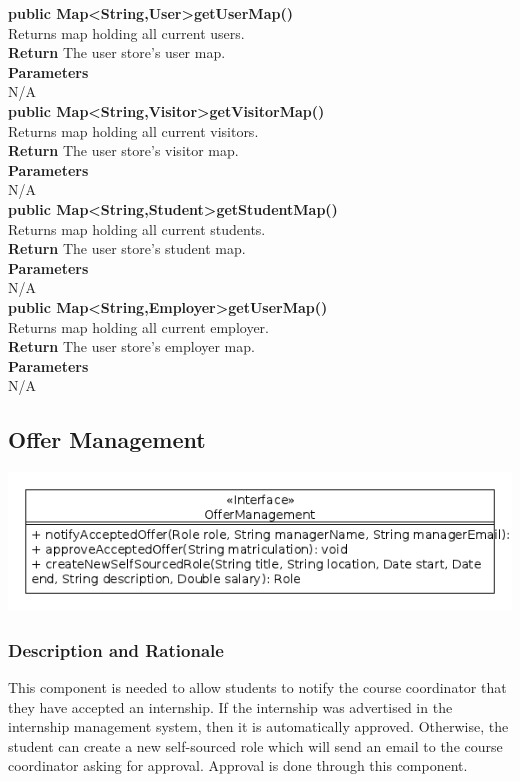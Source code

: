 \documentclass{l3deliverable}
\begin{document}
\textbf{public Map\textless String,User\textgreater  getUserMap()}\\
Returns map holding all current users.\\
\textbf{Return} The user store's user map.\\
\textbf{Parameters}\\
N/A
\\


\textbf{public Map\textless String,Visitor\textgreater   getVisitorMap()}\\
Returns map holding all current visitors.\\
\textbf{Return} The user store's visitor map.\\
\textbf{Parameters}\\
N/A
\\

\textbf{public Map\textless String,Student\textgreater   getStudentMap()}\\
Returns map holding all current students.\\
\textbf{Return} The user store's student map.\\
\textbf{Parameters}\\
N/A
\\

\textbf{public Map\textless String,Employer\textgreater   getUserMap()}\\
Returns map holding all current employer.\\
\textbf{Return} The user store's employer map.\\
\textbf{Parameters}\\
N/A
\\
\subsection{Offer Management}
\includegraphics[scale = 0.5]{OfferManagement.png}
\subsubsection{Description and Rationale}
This component is needed to allow students to notify the course coordinator that they have accepted an internship. If the internship was advertised in the internship management system, then it is automatically approved. Otherwise, the student can create a new self-sourced role which will send an email to the course coordinator asking for approval. Approval is done through this component.
\end{document}
